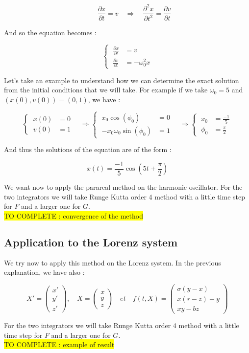$$\qquad \frac{\partial x}{\partial t}=v \quad \Rightarrow \quad \frac{\partial^2 x}{\partial t^2}=\frac{\partial v}{\partial t}$$

\noindent And so the equation becomes :

$$\left\{\;\begin{aligned}
	\frac{\partial x}{\partial t}&=v \\
	\frac{\partial v}{\partial t}&=-\omega_0^2 x
\end{aligned}\right.
$$

\noindent Let's take an example to understand how we can determine the exact solution from the initial conditions that we will take. For example if we take $\omega_0=5$ and $(x(0),v(0))=(0,1)$, we have :

$$\left\{\;\begin{aligned}
	x(0)&=0 \\
	v(0)&=1
\end{aligned}\right. \quad \Rightarrow 
\left\{\;\begin{aligned}
	x_0 \cos(\phi_0)&=0 \\
	-x_0 \omega_{0} \sin(\phi_0)&=1
\end{aligned}\right.  \quad \Rightarrow  
\left\{\;\begin{aligned}
	x_0&=\frac{-1}{5} \\
	\phi_0&=\frac{\pi}{2}
\end{aligned}\right.
$$

\noindent And thus the solutions of the equation are of the form :

$$x(t) = \frac{-1}{5}\cos(5t+\frac{\pi}{2})$$

\noindent We want now to apply the parareal method on the harmonic oscillator. For the two integrators we will take Runge Kutta order 4 method with a little time step for $F$ and a larger one for $G$. \\

\colorbox{yellow}{TO COMPLETE : convergence of the method}

\subsection{Application to the Lorenz system}

We try now to apply this method on the Lorenz system. In the previous explanation, we have also :

$$X'=\begin{pmatrix}
    x' \\
    y' \\
    z'
\end{pmatrix}, \quad X=\begin{pmatrix}
    x \\
    y \\
    z
\end{pmatrix} \quad et \quad f(t,X)=\begin{pmatrix}
    \sigma(y-x) \\
    x(r-z)-y \\
    xy-bz
\end{pmatrix}$$

\noindent For the two integrators we will take Runge Kutta order 4 method with a little time step for $F$ and a larger one for $G$. \\

\colorbox{yellow}{TO COMPLETE : example of result}
